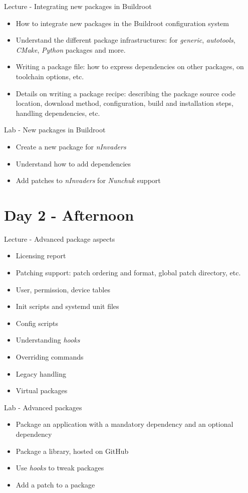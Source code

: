 \documentclass[a4paper,12pt,obeyspaces,spaces,hyphens]{article}
\begin{document}
\feagendatwocolumn
{Lecture - Integrating new packages in Buildroot}
{
  \begin{itemize}
  \item How to integrate new packages in the Buildroot configuration
    system
  \item Understand the different package infrastructures: for {\em
      generic}, {\em autotools}, {\em CMake}, {\em Python} packages
    and more.
  \item Writing a package  file: how to express
    dependencies on other packages, on toolchain options, etc.
  \item Details on writing a package recipe: describing the package
    source code location, download method, configuration, build and
    installation steps, handling dependencies, etc.
  \end{itemize}
}
{Lab - New packages in Buildroot}
{
  \begin{itemize}
  \item Create a new package for {\em nInvaders}
  \item Understand how to add dependencies
  \item Add patches to {\em nInvaders} for {\em Nunchuk} support
  \end{itemize}
}

\section{Day 2 - Afternoon}

\feagendatwocolumn
{Lecture - Advanced package aspects}
{
  \begin{itemize}
  \item Licensing report
  \item Patching support: patch ordering and format, global patch directory, etc.
  \item User, permission, device tables
  \item Init scripts and systemd unit files
  \item Config scripts
  \item Understanding {\em hooks}
  \item Overriding commands
  \item Legacy handling
  \item Virtual packages
  \end{itemize}
}
{Lab - Advanced packages}
{
  \begin{itemize}
  \item Package an application with a mandatory dependency and an
    optional dependency
  \item Package a library, hosted on GitHub
  \item Use {\em hooks} to tweak packages
  \item Add a patch to a package
  \end{itemize}
}
\end{document}
